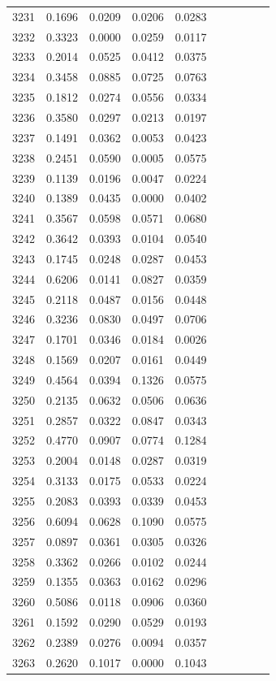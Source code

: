 \begin{table}
\begin{tabular}{cccccccccc}
3231& 0.1696& 0.0209& 0.0206& 0.0283\\ 
3232& 0.3323& 0.0000& 0.0259& 0.0117\\ 
3233& 0.2014& 0.0525& 0.0412& 0.0375\\ 
3234& 0.3458& 0.0885& 0.0725& 0.0763\\ 
3235& 0.1812& 0.0274& 0.0556& 0.0334\\ 
3236& 0.3580& 0.0297& 0.0213& 0.0197\\ 
3237& 0.1491& 0.0362& 0.0053& 0.0423\\ 
3238& 0.2451& 0.0590& 0.0005& 0.0575\\ 
3239& 0.1139& 0.0196& 0.0047& 0.0224\\ 
3240& 0.1389& 0.0435& 0.0000& 0.0402\\ 
3241& 0.3567& 0.0598& 0.0571& 0.0680\\ 
3242& 0.3642& 0.0393& 0.0104& 0.0540\\ 
3243& 0.1745& 0.0248& 0.0287& 0.0453\\ 
3244& 0.6206& 0.0141& 0.0827& 0.0359\\ 
3245& 0.2118& 0.0487& 0.0156& 0.0448\\ 
3246& 0.3236& 0.0830& 0.0497& 0.0706\\ 
3247& 0.1701& 0.0346& 0.0184& 0.0026\\ 
3248& 0.1569& 0.0207& 0.0161& 0.0449\\ 
3249& 0.4564& 0.0394& 0.1326& 0.0575\\ 
3250& 0.2135& 0.0632& 0.0506& 0.0636\\ 
3251& 0.2857& 0.0322& 0.0847& 0.0343\\ 
3252& 0.4770& 0.0907& 0.0774& 0.1284\\ 
3253& 0.2004& 0.0148& 0.0287& 0.0319\\ 
3254& 0.3133& 0.0175& 0.0533& 0.0224\\ 
3255& 0.2083& 0.0393& 0.0339& 0.0453\\ 
3256& 0.6094& 0.0628& 0.1090& 0.0575\\ 
3257& 0.0897& 0.0361& 0.0305& 0.0326\\ 
3258& 0.3362& 0.0266& 0.0102& 0.0244\\ 
3259& 0.1355& 0.0363& 0.0162& 0.0296\\ 
3260& 0.5086& 0.0118& 0.0906& 0.0360\\ 
3261& 0.1592& 0.0290& 0.0529& 0.0193\\ 
3262& 0.2389& 0.0276& 0.0094& 0.0357\\ 
3263& 0.2620& 0.1017& 0.0000& 0.1043\\ 

\end{tabular}
\end{table}
